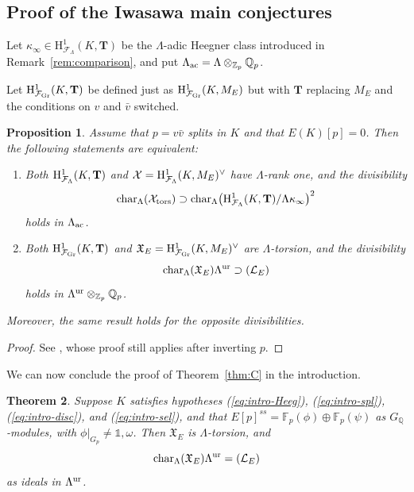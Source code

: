 \documentclass[10pt]{amsart}
\numberwithin{equation}{section}
\newtheorem{theorem}{Theorem}
\newtheorem{prop}[theorem]{Proposition}
\theoremstyle{definition}
\theoremstyle{remark}
\newcommand{\Z}{\mathbb{Z}}
\newcommand{\Fcal}{\mathcal{F}}
\newcommand{\bZ}{\mathbb{Z}}
\newcommand{\bQ}{\mathbb{Q}}
\newcommand{\Q}{\mathbb{Q}}
\newcommand{\rH}{\mathrm{H}}
\begin{document}
\subsection{Proof of the Iwasawa main conjectures}

Let $\kappa_\infty\in\rH^1_{\Fcal_\Lambda}(K,\mathbf{T})$ be the $\Lambda$-adic Heegner class introduced in Remark~\ref{rem:comparison}, and %
put $\Lambda_{\rm ac}=\Lambda\otimes_{\Z_p}\Q_p$.
{Let ${\rm H}^1_{\Fcal_{\rm Gr}}(K,\mathbf{T})$ be defined just as ${\rm H}^1_{\Fcal_{\rm Gr}}(K,M_E)$ but with 
$\mathbf{T}$ replacing $M_E$ and the conditions on $v$ and $\bar v$ switched.

\begin{prop}\label{prop:equiv-imc}
Assume that $p=v\bar{v}$ splits in $K$ and that $E(K)[p]=0$. 
Then the following statements are equivalent:
\begin{enumerate}
\item[(i)] Both ${\rm H}^1_{\Fcal_\Lambda}(K,\mathbf{T})$ and 
$\mathcal{X} = {\rm H}^1_{\Fcal_\Lambda}(K,M_E)^\vee$ have $\Lambda$-rank one, and the divisibility 
\[
\mathrm{char}_\Lambda(\mathcal{X}_{\rm tors}) \supset\mathrm{char}_\Lambda\bigl({\rm H}^1_{\Fcal_\Lambda}(K,\mathbf{T})/\Lambda\kappa_\infty\bigr)^2
\]
holds in $\Lambda_{\rm ac}$.
\item[(ii)]  Both ${\rm H}^1_{\Fcal_{\rm Gr}}(K,\mathbf{T})$ and $\mathfrak{X}_{E} = {\rm H}^1_{\Fcal_{\rm Gr}}(K,M_E)^\vee$ are $\Lambda$-torsion, and the divisibility 
\[
\mathrm{char}_\Lambda(\mathfrak{X}_{E})\Lambda^{\rm ur}\supset(\mathcal{L}_E)
\]
holds in $\Lambda^{\rm ur}\otimes_{\bZ_p}\bQ_p$.
\end{enumerate}
Moreover, the same result holds for the opposite divisibilities.
\end{prop}
}

\begin{proof}
See \cite[Thm.~5.2]{BCK}, whose proof still applies after inverting $p$. 
\end{proof}

We can now conclude the proof of Theorem~\ref{thm:C} in the introduction. 

\begin{theorem}\label{thm:thmA}
Suppose $K$ satisfies hypotheses {\rm (\ref{eq:intro-Heeg})}, {\rm (\ref{eq:intro-spl})}, {\rm (\ref{eq:intro-disc})}, and 
{\rm (\ref{eq:intro-sel})}, and that
$E[p]^{ss}=\mathbb{F}_p(\phi)\oplus\mathbb{F}_p(\psi)$ as $G_\bQ$-modules, with $\phi\vert_{G_p}\neq\mathds{1},\omega$.
Then $\mathfrak{X}_E$ is $\Lambda$-torsion, and
\[
{\rm char}_\Lambda(\mathfrak{X}_E)\Lambda^{\rm ur}=(\mathcal{L}_E)
\]
as ideals in $\Lambda^{\rm ur}$. 
\end{theorem}
\end{document}

